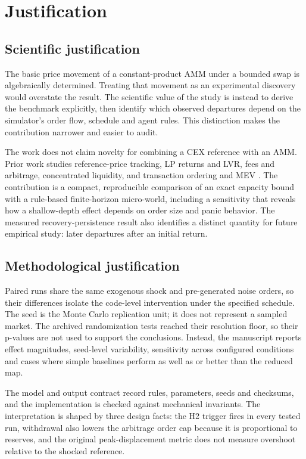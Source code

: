 \chapter{Justification}
\label{cap:justificacion}

\section{Scientific justification}

The basic price movement of a constant-product AMM under a bounded swap is algebraically determined. Treating that movement as an experimental discovery would overstate the result. The scientific value of the study is instead to derive the benchmark explicitly, then identify which observed departures depend on the simulator's order flow, schedule and agent rules. This distinction makes the contribution narrower and easier to audit.

The work does not claim novelty for combining a CEX reference with an AMM. Prior work studies reference-price tracking, LP returns and LVR, fees and arbitrage, concentrated liquidity, and transaction ordering and MEV \cite{angeris2020uniswap,milionis2022lvr,heimbach2022risks,daian2020flash,adams2021uniswapv3}. The contribution is a compact, reproducible comparison of an exact capacity bound with a rule-based finite-horizon micro-world, including a sensitivity that reveals how a shallow-depth effect depends on order size and panic behavior. The measured recovery-persistence result also identifies a distinct quantity for future empirical study: later departures after an initial return.

\section{Methodological justification}

Paired runs share the same exogenous shock and pre-generated noise orders, so their differences isolate the code-level intervention under the specified schedule. The seed is the Monte Carlo replication unit; it does not represent a sampled market. The archived randomization tests reached their resolution floor, so their p-values are not used to support the conclusions. Instead, the manuscript reports effect magnitudes, seed-level variability, sensitivity across configured conditions and cases where simple baselines perform as well as or better than the reduced map.

The model and output contract record rules, parameters, seeds and checksums, and the implementation is checked against mechanical invariants. The interpretation is shaped by three design facts: the H2 trigger fires in every tested run, withdrawal also lowers the arbitrage order cap because it is proportional to reserves, and the original peak-displacement metric does not measure overshoot relative to the shocked reference.

